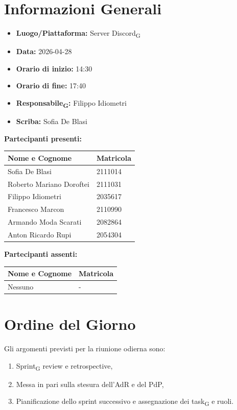 \section{Informazioni Generali}
\begin{itemize}
	\item \textbf{Luogo/Piattaforma:} Server Discord\textsubscript{G}
	\item \textbf{Data:} 2026-04-28
	\item \textbf{Orario di inizio:} 14:30
	\item \textbf{Orario di fine:} 17:40
	\item \textbf{Responsabile\textsubscript{G}:} Filippo Idiometri
	\item \textbf{Scriba:} Sofia De Blasi
\end{itemize}

\vspace{0.5cm}
\textbf{Partecipanti presenti:}
\begin{table}[ht]
	\centering
	\renewcommand{\arraystretch}{1.2}
	\begin{tabularx}{\textwidth}{X l}
		\toprule
		\textbf{Nome e Cognome} & \textbf{Matricola} \\
		\midrule
		Sofia De Blasi & 2111014 \\
		Roberto Mariano Doroftei & 2111031 \\
		Filippo Idiometri & 2035617 \\
		Francesco Marcon & 2110990 \\
		Armando Moda Scarati & 2082864 \\
		Anton Ricardo Rupi & 2054304 \\
		\bottomrule
	\end{tabularx}
\end{table}

\vspace{0.5cm}
\textbf{Partecipanti assenti:}
\begin{table}[ht]
	\centering
	\renewcommand{\arraystretch}{1.2}
	\begin{tabularx}{\textwidth}{X l}
		\toprule
		\textbf{Nome e Cognome} & \textbf{Matricola} \\
		\midrule
		Nessuno & - \\
		\bottomrule
	\end{tabularx}
\end{table}

\section{Ordine del Giorno}
Gli argomenti previsti per la riunione odierna sono:
\begin{enumerate}
	\item Sprint\textsubscript{G} review e retrospective,
	\item Messa in pari sulla stesura dell'AdR e del PdP,
	\item Pianificazione dello sprint successivo e assegnazione dei task\textsubscript{G} e ruoli.
\end{enumerate}

